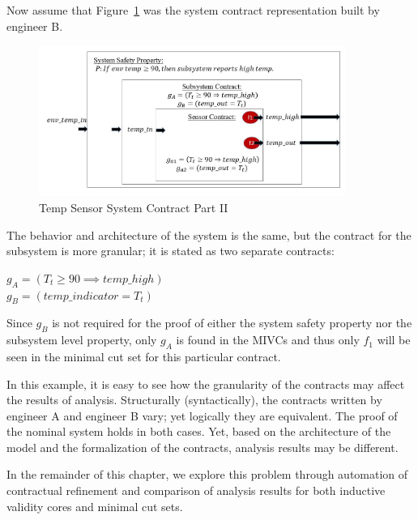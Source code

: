 Now assume that Figure~\ref{fig:granularityEx2} was the system contract representation built by engineer B. 

\begin{figure}[h!]
\begin{center}
\includegraphics[width=10cm]{images/granEx2.jpg}
\caption{Temp Sensor System Contract Part II} \label{fig:granularityEx2}
\end{center}
\end{figure} 

The behavior and architecture of the system is the same, but the contract for the subsystem is more granular; it is stated as two separate contracts:
\begin{center}
    $ g_A = (T_t \geq 90 \implies temp\_high)$ \\ 
    $ g_B = (temp\_indicator = T_t)$ 
\end{center}

Since $g_B$ is not required for the proof of either the system safety property nor the subsystem level property, only $g_A$ is found in the MIVCs and thus only $f_1$ will be seen in the minimal cut set for this particular contract. 
 
In this example, it is easy to see how the granularity of the contracts may affect the results of analysis. Structurally (syntactically), the contracts written by engineer A and engineer B vary; yet logically they are equivalent. The proof of the nominal system holds in both cases. Yet, based on the architecture of the model and the formalization of the contracts, analysis results may be different. 

In the remainder of this chapter, we explore this problem through automation of contractual refinement and comparison of analysis results for both inductive validity cores and minimal cut sets. 